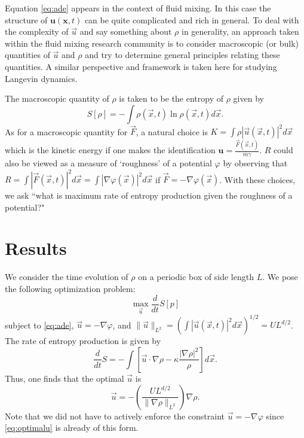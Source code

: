 Equation \eqref{eq:ade} appears in the context of fluid mixing. In this case the structure of $\mathbf{u}(\mathbf{x},t)$ can be quite complicated and rich in general. To deal with the complexity of $\vec{u}$ and say something about $\rho$ in generality, an approach taken within the fluid mixing research community is to  consider macroscopic (or bulk) quantities of $\vec{u}$ and $\rho$ and try to determine general principles relating these quantities. A similar perspective and framework is taken here for studying Langevin dynamics.

The macroscopic quantity of $\rho$ is taken to be the entropy of $\rho$ given by
%
 \begin{equation}
S[\rho] = - \int \rho(\vec{x},t) \ln \rho(\vec{x},t) d\vec{x}.
\end{equation}
%
As for a macroscopic quantity for $\vec{F}$, a natural choice is $K = \int \rho|\vec{u}(\vec{x},t)|^2 d\vec{x}$ which is the kinetic energy if one makes the identification $\mathbf{u}=\frac{\vec{F}(\vec{x},t)}{m\gamma}$. $R$ could also be viewed as a measure of `roughness' of a potential $\varphi$ by observing that $R = \int |\vec{F}(\vec{x},t)|^2 d\vec{x} = \int |\nabla \varphi(\vec{x})|^2 d\vec{x}$ if $\vec{F} = - \nabla \varphi ( \vec{x})$. With these choices, we ask ``what is maximum rate  of entropy production given the roughness of a potential?" 



\section{Results}

We consider the time evolution of $\rho$ on a periodic box of side length $L$. We pose the following optimization problem:
%
\begin{equation}
\max_{\vec{u}} \frac{d}{dt}S[p]
\end{equation}
%
subject to \eqref{eq:ade}, $\vec{u}= - \nabla \varphi$, and  $\|\vec{u}\|_{L^{2}}=(\int |\vec{u}(\vec{x},t)|^2 d\vec{x})^{1/2} = UL^{d/2}$. The rate of entropy production is given by 
%
\begin{equation}
\frac{d}{dt}S = -\int \left[ \vec{u}\cdot\nabla\rho - \kappa \frac{|\nabla \rho|^2}{\rho} \right] d\vec{x}.
\end{equation}
%
Thus, one finds that the optimal $\vec{u}$ is 
%
\begin{equation}
\vec{u} = - \left(\frac{UL^{d/2}}{\| \nabla \rho \|_{L^2}}\right) \nabla \rho.
\label{eq:optimalu}
\end{equation}
Note that we did not have to actively enforce the constraint $\vec{u}= - \nabla \varphi$ since \eqref{eq:optimalu} is already of this form. 




